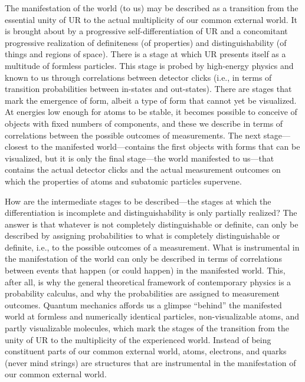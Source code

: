 \documentclass[12pt]{article}
\begin{document}
The manifestation of the world (to us) may be described as a transition from the essential unity of UR to the actual {multiplicity} of our common external world. It is brought about by a progressive self-differentiation of UR and a concomitant progressive realization of definiteness (of properties) and distinguishability (of things and regions of space). There is a stage at which UR presents itself as a multitude of formless particles. This stage is probed by high-energy physics and known to us through {correlations} between {detector clicks} (i.e., in terms of transition probabilities between in-states and out-states). There are stages that mark the emergence of form, albeit a type of form that cannot yet be visualized. At energies low enough for atoms to be stable, it becomes possible to conceive of objects with fixed numbers of components, and these we describe in terms of {correlations} between the possible outcomes of measurements. The next stage---closest to the manifested world---contains the first objects with forms that can be visualized, but it is only the final stage---the world manifested to us---that contains the actual {detector clicks} and the actual measurement outcomes on which the properties of atoms and subatomic particles supervene.

How are the intermediate stages to be described---the stages at which the differentiation is incomplete and distinguishability is only partially realized? The answer is that whatever is not completely distinguishable or definite, can only be described by assigning probabilities to what is completely distinguishable or definite, i.e., to the possible outcomes of a measurement. What is instrumental in the manifestation of the world can only be described in terms of {correlations} between events that happen (or could happen) in the manifested world. This, after all, is why the general theoretical framework of contemporary physics is a probability calculus, and why the probabilities are assigned to measurement outcomes. Quantum mechanics affords us a glimpse ``behind'' the manifested world at formless and numerically identical particles, non-visualizable atoms, and partly visualizable molecules, which mark the stages of the transition from the unity of UR to the multiplicity of the experienced world. Instead of being constituent parts of our common external world, atoms, electrons, and quarks (never mind strings) are structures that are instrumental in the {manifestation} of our common external world.
\end{document}
